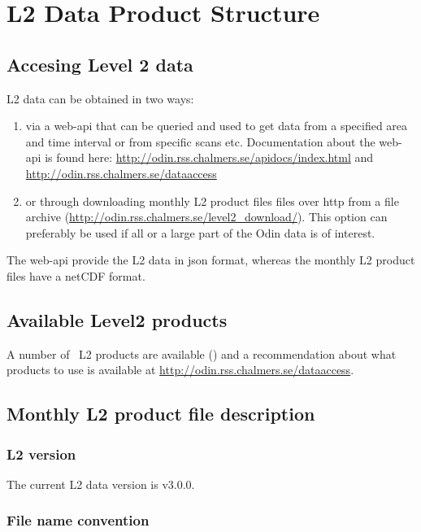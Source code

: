\chapter{L2 Data Product Structure}
\label{chapter:L2_structure}

\section{Accesing Level 2 data}

L2 data can be obtained in two ways:

\begin{enumerate}

\item via a web-api that can be queried and used to get data from
  a specified area and time interval or from specific scans etc.
  Documentation about the web-api is found here: 
  \url{http://odin.rss.chalmers.se/apidocs/index.html} and
  \url{http://odin.rss.chalmers.se/dataaccess}

\item or through downloading monthly L2 product files files over http
  from a file archive (\url{http://odin.rss.chalmers.se/level2_download/}).
  This option can preferably be used if all or a large part of the
  Odin data is of interest.

\end{enumerate}

The web-api provide the L2 data in json format, whereas the
monthly L2 product files have a netCDF format.

\section{Available Level2 products}

A number of \smr\ L2 products are available (\cite{dds}) and
a recommendation about what products to use is available
at \url{http://odin.rss.chalmers.se/dataaccess}.

\section{Monthly L2 product file description}

\subsection{L2 version}
The current L2 data version is v3.0.0.

\subsection{File name convention}

